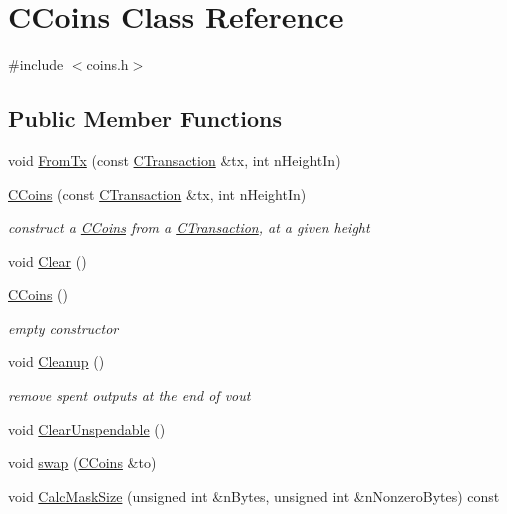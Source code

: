 \hypertarget{class_c_coins}{}\section{C\+Coins Class Reference}
\label{class_c_coins}


{\ttfamily \#include $<$coins.\+h$>$}

\subsection*{Public Member Functions}
\begin{DoxyCompactItemize}
\item 
void \hyperlink{class_c_coins_abf67e501a1d207c892c1f52dd383956e}{From\+Tx} (const \hyperlink{class_c_transaction}{C\+Transaction} \&tx, int n\+Height\+In)
\item 
\hyperlink{class_c_coins_a303f3b245c339c11a1ea4318b01ec290}{C\+Coins} (const \hyperlink{class_c_transaction}{C\+Transaction} \&tx, int n\+Height\+In)
\begin{DoxyCompactList}\small\item\em construct a \hyperlink{class_c_coins}{C\+Coins} from a \hyperlink{class_c_transaction}{C\+Transaction}, at a given height \end{DoxyCompactList}\item 
void \hyperlink{class_c_coins_a4d4197688436b752234bea95f0230b82}{Clear} ()
\item 
\hyperlink{class_c_coins_a543757065d6c77d23953a33eecb31a46}{C\+Coins} ()
\begin{DoxyCompactList}\small\item\em empty constructor \end{DoxyCompactList}\item 
void \hyperlink{class_c_coins_a7cfa2efc07f4d35785c9c75caa8bddcb}{Cleanup} ()
\begin{DoxyCompactList}\small\item\em remove spent outputs at the end of vout \end{DoxyCompactList}\item 
void \hyperlink{class_c_coins_ad8b649abb32bdba255adec6dcfd57fc5}{Clear\+Unspendable} ()
\item 
void \hyperlink{class_c_coins_a9581324a74e9500b3d2cad472c0a830f}{swap} (\hyperlink{class_c_coins}{C\+Coins} \&to)
\item 
void \hyperlink{class_c_coins_a3dab547bdbce1152a2375c5c6c017ad5}{Calc\+Mask\+Size} (unsigned int \&n\+Bytes, unsigned int \&n\+Nonzero\+Bytes) const 

\end{DoxyCompactItemize}
